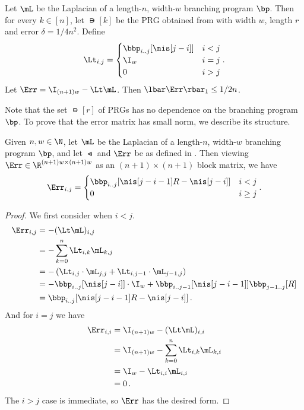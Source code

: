 \documentclass{toc}
\begin{document}
\begin{proposition}\label{prop:pathErrSmall}
Let $\mL$ be the Laplacian of a length-$n$, width-$w$ branching program $\bp$. Then for every $k\in[n]$, let $\nis[k]$ be the PRG obtained from  with width $w$, length $r$ and error $\delta=1/4n^2$. Define
\[\Lt_{i,j}=\begin{cases}
\bbp_{i..j}[\nis[j-i]] & i<j\\
\I_w & i=j\\
0 & i>j
\end{cases}.\] 
Let $\Err=\I_{(n+1)w}-\Lt \mL$. Then $\lbar\Err\rbar_1\leq 1/2n$. %
\end{proposition}
%
Note that the set $\nis[r]$ of PRGs has %
no dependence on the branching program $\bp$. To prove
that  %
the error matrix has small norm, we describe its structure.
\begin{lemma}\label{lem:pathErrStruct}
Given $n,w\in \N$, let $\mL$ be the Laplacian of a length-$n$, width-$w$ branching program $\bp$, and let $\Lt$ and $\Err$ be as defined in . Then viewing $\Err\in \R^{(n+1)w\times(n+1)w}$ as an $(n+1)\times(n+1)$ block matrix, 
we have %
\[\Err_{i,j} = \begin{cases}
\bbp_{i..j}[\nis[j-i-1]R-\nis[j-i]] & i<j\\
0 & i\geq j
\end{cases}.\]
\end{lemma}
\begin{proof}
We first consider when $i<j$. %
\begin{align*}
    \Err_{i,j} &= -(\Lt \mL)_{i,j}\\
    &= -\sum_{k=0}^{n}\Lt_{i,k}\mL_{k,j}\\
    &= -\left(\Lt_{i,j}\cdot \mL_{j,j}+\Lt_{i,j-1}\cdot \mL_{j-1,j}\right)\\
    &= -\bbp_{i..j}[\nis[j-i]]\cdot \I_w+\bbp_{i..j-1}[\nis[j-i-1]]\bbp_{j-1..j}[R]\\
    &= \bbp_{i..j}[\nis[j-i-1]R-\nis[j-i]]\,.
\end{align*}
%
And for $i=j$ we have  %
\begin{align*}
    \Err_{i,i} &= \I_{(n+1)w}-(\Lt \mL)_{i,i}\\
    &= \I_{(n+1)w} - \sum_{k=0}^{n}\Lt_{i,k}\mL_{k,i}\\
    &= \I_w - \Lt_{i,i}\mL_{i,i}\\
    &= 0\,.  %
\end{align*}
The $i>j$ case is immediate, so $\Err$ has the desired form.
\end{proof}
\end{document}
